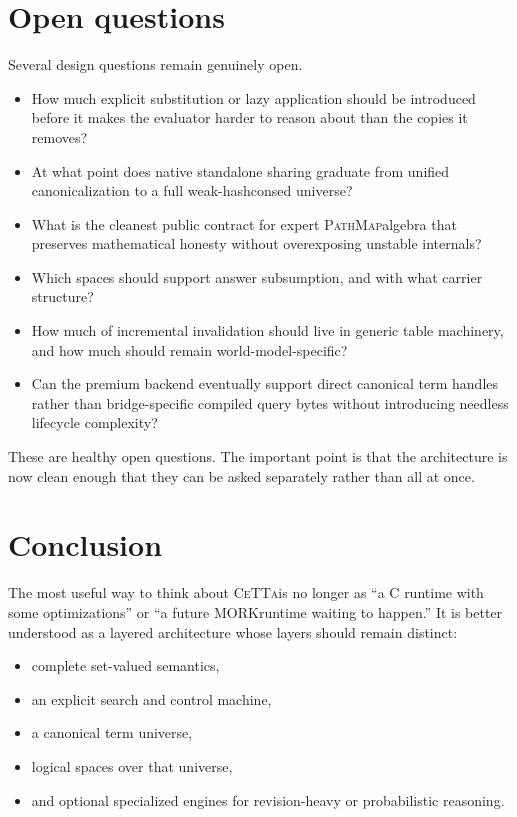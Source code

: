 \documentclass[11pt]{article}
\newcommand{\CeTTa}{\textsc{CeTTa}}
\newcommand{\PathMap}{\textsc{PathMap}}
\newcommand{\MORK}{\textsc{MORK}}
\begin{document}
\section{Open questions}
Several design questions remain genuinely open.
\begin{itemize}
    \item How much explicit substitution or lazy application should be introduced before it makes the evaluator harder to reason about than the copies it removes?
    \item At what point does native standalone sharing graduate from unified canonicalization to a full weak-hashconsed universe?
    \item What is the cleanest public contract for expert \PathMap algebra that preserves mathematical honesty without overexposing unstable internals?
    \item Which spaces should support answer subsumption, and with what carrier structure?
    \item How much of incremental invalidation should live in generic table machinery, and how much should remain world-model-specific?
    \item Can the premium backend eventually support direct canonical term handles rather than bridge-specific compiled query bytes without introducing needless lifecycle complexity?
\end{itemize}

These are healthy open questions. The important point is that the architecture is now clean enough that they can be asked separately rather than all at once.

\section{Conclusion}
The most useful way to think about \CeTTa is no longer as ``a C runtime with some optimizations'' or ``a future \MORK runtime waiting to happen.'' It is better understood as a layered architecture whose layers should remain distinct:
\begin{itemize}
    \item complete set-valued semantics,
    \item an explicit search and control machine,
    \item a canonical term universe,
    \item logical spaces over that universe,
    \item and optional specialized engines for revision-heavy or probabilistic reasoning.
\end{itemize}
\end{document}
